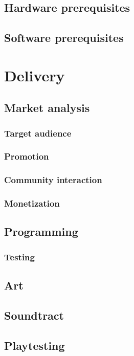 \documentclass{article}[10pt]
\begin{document}
\subsection{Hardware prerequisites}
\subsection{Software prerequisites}
\pagebreak

\section{Delivery}
\subsection{Market analysis}
\subsubsection{Target audience}
\subsubsection{Promotion}
\subsubsection{Community interaction}
\subsubsection{Monetization}

\subsection{Programming}
\subsubsection{Testing}

\subsection{Art}
\subsection{Soundtract}
\subsection{Playtesting}
\end{document}
